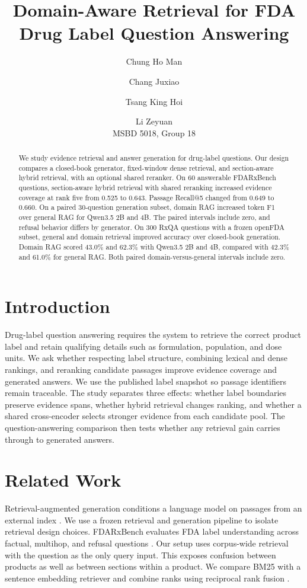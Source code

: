 \documentclass[11pt]{article}
\title{Domain-Aware Retrieval for FDA Drug Label Question Answering}
\author{Chung Ho Man \and Chang Juxiao \and Tsang King Hoi \and Li Zeyuan\\MSBD 5018, Group 18}
\begin{document}
\maketitle
\begin{abstract}
We study evidence retrieval and answer generation for drug-label questions. Our design compares a closed-book generator, fixed-window dense retrieval, and section-aware hybrid retrieval, with an optional shared reranker. On 60 answerable FDARxBench questions, section-aware hybrid retrieval with shared reranking increased evidence coverage at rank five from 0.525 to 0.643. Passage Recall@5 changed from 0.649 to 0.660. On a paired 30-question generation subset, domain RAG increased token F1 over general RAG for Qwen3.5 2B and 4B. The paired intervals include zero, and refusal behavior differs by generator. On 300 RxQA questions with a frozen openFDA subset, general and domain retrieval improved accuracy over closed-book generation. Domain RAG scored 43.0\% and 62.3\% with Qwen3.5 2B and 4B, compared with 42.3\% and 61.0\% for general RAG. Both paired domain-versus-general intervals include zero.
\end{abstract}
\section{Introduction}
Drug-label question answering requires the system to retrieve the correct product label and retain qualifying details such as formulation, population, and dose units. We ask whether respecting label structure, combining lexical and dense rankings, and reranking candidate passages improve evidence coverage and generated answers. We use the published label snapshot so passage identifiers remain traceable. The study separates three effects: whether label boundaries preserve evidence spans, whether hybrid retrieval changes ranking, and whether a shared cross-encoder selects stronger evidence from each candidate pool. The question-answering comparison then tests whether any retrieval gain carries through to generated answers.
\section{Related Work}
Retrieval-augmented generation conditions a language model on passages from an external index \citep{lewis2020}. We use a frozen retrieval and generation pipeline to isolate retrieval design choices. FDARxBench evaluates FDA label understanding across factual, multihop, and refusal questions \citep{xiong2026}. Our setup uses corpus-wide retrieval with the question as the only query input. This exposes confusion between products as well as between sections within a product. We compare BM25 \citep{robertson2009} with a sentence embedding retriever and combine ranks using reciprocal rank fusion \citep{cormack2009}.
\end{document}
